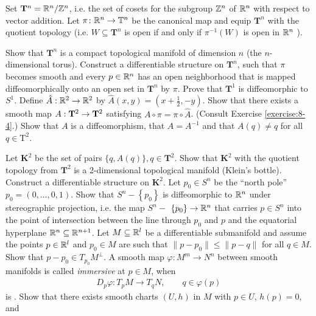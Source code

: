 \begin{enumerate}[label=\theexercise.\arabic*.,ref=\theexercise.\arabic*,leftmargin=2.7em]
  \NewItem Set ${\mathbf{T}}^{n} = {\mathbb{R}}^{n}/{\mathbb{Z}}^{n}$, i.e. the set of cosets for the subgroup ${\mathbb{Z}}^{n}$ of ${\mathbb{R}}^{n}$ with respect to vector addition. Let $\pi\colon  {\ensuremath{\mathbb{R}}}^{n} \rightarrow  {\ensuremath{\mathbb{T}}}^{n}$ be the canonical map and equip ${\mathbf{T}}^{n}$ with the quotient topology (i.e. $W \subseteq  {\mathbf{T}}^{n}$ is open if and only if ${\pi }^{-1}( W)$ is open in ${\mathbb{R}}^{n}$ ).\par
    Show that ${\mathbf{T}}^{n}$ is a compact topological manifold of dimension $n$ (the $n$- dimensional torus). Construct a differentiable structure on ${\mathbf{T}}^{n}$, such that $\pi$ becomes smooth and every $p \in  {\ensuremath{\mathbb{R}}}^{n}$ has an open neighborhood that is mapped diffeomorphically onto an open set in ${\mathbf{T}}^{n}$ by $\pi$. Prove that ${\mathbf{T}}^{1}$ is diffeomorphic to ${S}^{1}$.
  \NewItem Define $\hat{A} : {\mathbb{R}}^{2} \rightarrow  {\ensuremath{\mathbb{R}}}^{2}$ by $\hat{A}( {x,y})  = ( {x + \frac{1}{2},- y})$. Show that there exists a smooth map $A : {\mathbf{T}}^{2} \rightarrow  {\mathbf{T}}^{2}$ satisfying $A \circ  \pi  = \pi  \circ  \hat{A}$. (Consult Exercise \ref{exercise:8-4}.) Show that $A$ is a diffeomorphism, that $A = {A}^{-1}$ and that $A( q)  \neq  q$ for all $q \in  {\mathrm{T}}^{2}$.\par
    Let ${\mathbf{K}}^{2}$ be the set of pairs $\{ q,A( q) \},q \in  {\mathbf{T}}^{2}$. Show that ${\mathbf{K}}^{2}$ with the quotient topology from ${\mathbf{T}}^{2}$ is a 2-dimensional topological manifold (Klein's bottle).
    Construct a differentiable structure on ${\mathbf{K}}^{2}$.
  \NewItem Let ${p}_{0} \in  {S}^{n}$ be the ``north pole'' ${p}_{0} = ( {0,\ldots,0,1})$. Show that ${S}^{n}- \left\{  {p}_{0}\right\}$ is diffeomorphic to ${\mathbb{R}}^{n}$ under stereographic projection, i.e. the map ${S}^{n}-$  $\left\{  {p}_{0}\right\}   \rightarrow  {\ensuremath{\mathbb{R}}}^{n}$ that carries $p \in  {S}^{n}$ into the point of intersection between the line through ${p}_{0}$ and $p$ and the equatorial hyperplane ${\mathbb{R}}^{n} \subseteq  {\ensuremath{\mathbb{R}}}^{n + 1}$.
  \newchap[9]
  \NewItem Let $M\subseteq{\ensuremath{\mathbb{R}}}^l$ be a differentiable submanifold and assume the points
    $p\in {\ensuremath{\mathbb{R}}}^l$ and $p_0\in M$ are such that $\|p-p_0\|\le \|p-q\|$ for all $q\in M$. Show that
    $p-p_0\in T_{p_0}M^\perp$.
  \NewItem A smooth map $\varphi:M^m\to N^n$ between smooth manifolds is called \textit{immersive} at $p\in M$, when
    \begin{align*}
      D_p\varphi:T_pM\to T_{q}N, \qquad q\in\varphi(p)
    \end{align*}
    is . Show that there exists smooth charts $(U, h)$ in $M$ with $p\in U$, $h(p)=0$, and

\end{enumerate}
